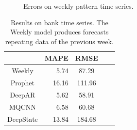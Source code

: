 \documentclass[a4paper, 12pt]{article} %
\newcommand{\ra}[1]{\renewcommand{\arraystretch}{#1}}
\begin{document}
	
	\begin{figure}\centering
		 \hfill
		
		\caption{Errors on weekly pattern time series.}
		\label{fig:results_forecasting_bank}
	\end{figure}
	
	\begin{table}\centering 
		\ra{1.3}
		\begin{tabular}{@{}crcrc@{}}
			\midrule
			& MAPE & RMSE\\
			\midrule
			Weekly & 5.74 & 87.29\\
			Prophet & 16.16 & 111.96\\
			DeepAR & 5.62 & 58.91\\
			MQCNN & 6.58 & 60.68\\
			DeepState & 13.84 & 184.68\\
			\bottomrule
		\end{tabular}
		\caption{Results on bank time series. The Weekly model produces forecasts repeating data of the previous week.} \label{table:results_forecasting_bank}
	\end{table}
\end{document}
